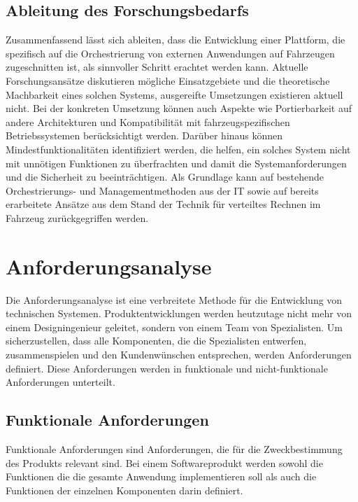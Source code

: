 \subsection{Ableitung des Forschungsbedarfs}

Zusammenfassend lässt sich ableiten, dass die Entwicklung einer Plattform, die spezifisch auf die Orchestrierung von externen Anwendungen auf Fahrzeugen zugeschnitten ist, als sinnvoller Schritt erachtet werden kann. Aktuelle Forschungsansätze diskutieren mögliche Einsatzgebiete und die theoretische Machbarkeit eines solchen Systems, ausgereifte Umsetzungen existieren aktuell nicht. Bei der konkreten Umsetzung können auch Aspekte wie Portierbarkeit auf andere Architekturen und Kompatibilität mit fahrzeugspezifischen Betriebssystemen berücksichtigt werden. Darüber hinaus können Mindestfunktionalitäten identifiziert werden, die helfen, ein solches System nicht mit unnötigen Funktionen zu überfrachten und damit die Systemanforderungen und die Sicherheit zu beeinträchtigen. Als Grundlage kann auf bestehende Orchestrierungs- und Managementmethoden aus der IT sowie auf bereits erarbeitete Ansätze aus dem Stand der Technik für verteiltes Rechnen im Fahrzeug zurückgegriffen werden.

\section{Anforderungsanalyse}
\label{Anforderungsanalyse}

Die Anforderungsanalyse ist eine verbreitete Methode für die Entwicklung von technischen Systemen. Produktentwicklungen werden heutzutage nicht mehr von einem Designingenieur geleitet, sondern von einem Team von Spezialisten. Um sicherzustellen, dass alle Komponenten, die die Spezialisten entwerfen, zusammenspielen und den Kundenwünschen entsprechen, werden Anforderungen definiert. Diese Anforderungen werden in funktionale und nicht-funktionale Anforderungen unterteilt. \cite{Grady2010}

\subsection{Funktionale Anforderungen}

Funktionale Anforderungen sind Anforderungen, die für die Zweckbestimmung des Produkts relevant sind. Bei einem Softwareprodukt werden sowohl die Funktionen die die gesamte Anwendung implementieren soll als auch die Funktionen der einzelnen Komponenten darin definiert. 

